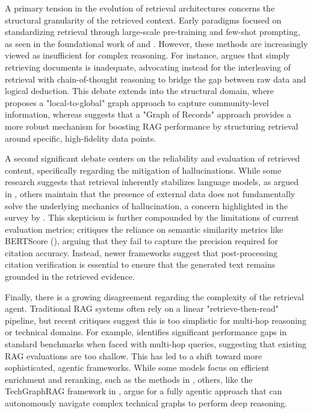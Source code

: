 \documentclass[11pt]{article}
\begin{document}
A primary tension in the evolution of retrieval architectures concerns the structural granularity of the retrieved context. Early paradigms focused on standardizing retrieval through large-scale pre-training and few-shot prompting, as seen in the foundational work of \citep{2112.04426} and \citep{2208.03299}. However, these methods are increasingly viewed as insufficient for complex reasoning. For instance, \citep{2212.10509} argues that simply retrieving documents is inadequate, advocating instead for the interleaving of retrieval with chain-of-thought reasoning to bridge the gap between raw data and logical deduction. This debate extends into the structural domain, where \citep{2404.16130} proposes a "local-to-global" graph approach to capture community-level information, whereas \citep{2410.11001} suggests that a "Graph of Records" approach provides a more robust mechanism for boosting RAG performance by structuring retrieval around specific, high-fidelity data points.

A second significant debate centers on the reliability and evaluation of retrieved content, specifically regarding the mitigation of hallucinations. While some research suggests that retrieval inherently stabilizes language models, as argued in \citep{2104.07567}, others maintain that the presence of external data does not fundamentally solve the underlying mechanics of hallucination, a concern highlighted in the survey by \citep{2202.03629}. This skepticism is further compounded by the limitations of current evaluation metrics; \citep{2504.15629} critiques the reliance on semantic similarity metrics like BERTScore (\citep{1904.09675}), arguing that they fail to capture the precision required for citation accuracy. Instead, newer frameworks suggest that post-processing citation verification is essential to ensure that the generated text remains grounded in the retrieved evidence.

Finally, there is a growing disagreement regarding the complexity of the retrieval agent. Traditional RAG systems often rely on a linear "retrieve-then-read" pipeline, but recent critiques suggest this is too simplistic for multi-hop reasoning or technical domains. For example, \citep{2401.15391} identifies significant performance gaps in standard benchmarks when faced with multi-hop queries, suggesting that existing RAG evaluations are too shallow. This has led to a shift toward more sophisticated, agentic frameworks. While some models focus on efficient enrichment and reranking, such as the methods in \citep{2603.24925}, others, like the TechGraphRAG framework in \citep{2606.01613}, argue for a fully agentic approach that can autonomously navigate complex technical graphs to perform deep reasoning.
\end{document}

